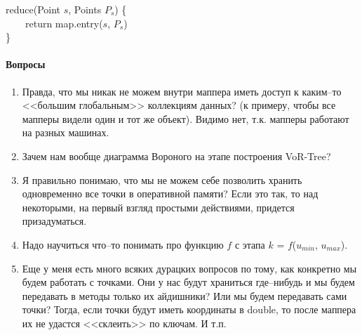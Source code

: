 \documentclass{article}
\begin{document}
{            \noindent reduce(Point $s$, Points $P_s$) \{    \\
            \phantom ~~~~return map.entry($s$, $P_s$)    \\         
                     \}
        }
        
    \paragraph{Вопросы}
        \begin{enumerate}
            \item Правда, что мы никак не можем внутри маппера иметь доступ к каким--то <<большим глобальным>> коллекциям данных? (к примеру, чтобы все мапперы видели один и тот же объект). Видимо нет, т.к. мапперы работают на разных машинах.
            \item Зачем нам вообще диаграмма Вороного на этапе построения VoR-Tree?
            \item Я правильно понимаю, что мы не можем себе позволить хранить одновременно все точки в оперативной памяти? Если это так, то над некоторыми, на первый взгляд простыми действиями, придется призадуматься.
            \item Надо научиться что--то понимать про функцию $f$ с этапа $k$ = $f$($u_{min}$, $u_{max}$).
            \item Еще у меня есть много всяких дурацких вопросов по тому, как конкретно мы будем работать с точками. Они у нас будут храниться где--нибудь и мы будем передавать в методы только их айдишники? Или мы будем передавать сами точки? Тогда, если точки будут иметь координаты в double, то после маппера их не удастся <<склеить>> по ключам. И т.п.
        \end{enumerate}
	
	
	
	
\end{document}
